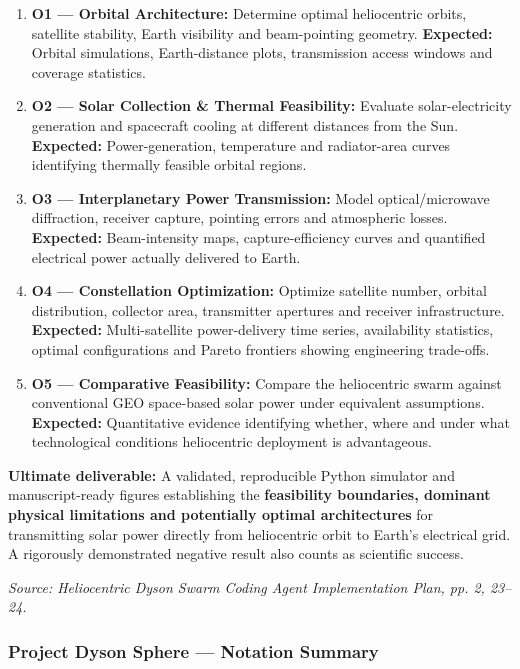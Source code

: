 \documentclass{article}
\begin{document}
\begin{enumerate}
\item \textbf{O1 --- Orbital Architecture:} Determine optimal heliocentric orbits, satellite stability, Earth visibility and beam-pointing geometry. \textbf{Expected:} Orbital simulations, Earth-distance plots, transmission access windows and coverage statistics.
\item \textbf{O2 --- Solar Collection \& Thermal Feasibility:} Evaluate solar-electricity generation and spacecraft cooling at different distances from the Sun. \textbf{Expected:} Power-generation, temperature and radiator-area curves identifying thermally feasible orbital regions.
\item \textbf{O3 --- Interplanetary Power Transmission:} Model optical/microwave diffraction, receiver capture, pointing errors and atmospheric losses. \textbf{Expected:} Beam-intensity maps, capture-efficiency curves and quantified electrical power actually delivered to Earth.
\item \textbf{O4 --- Constellation Optimization:} Optimize satellite number, orbital distribution, collector area, transmitter apertures and receiver infrastructure. \textbf{Expected:} Multi-satellite power-delivery time series, availability statistics, optimal configurations and Pareto frontiers showing engineering trade-offs.
\item \textbf{O5 --- Comparative Feasibility:} Compare the heliocentric swarm against conventional GEO space-based solar power under equivalent assumptions. \textbf{Expected:} Quantitative evidence identifying whether, where and under what technological conditions heliocentric deployment is advantageous.
\end{enumerate}

\textbf{Ultimate deliverable:} A validated, reproducible Python simulator and manuscript-ready figures establishing the \textbf{feasibility boundaries, dominant physical limitations and potentially optimal architectures} for transmitting solar power directly from heliocentric orbit to Earth's electrical grid. A rigorously demonstrated negative result also counts as scientific success.

\textit{Source: Heliocentric Dyson Swarm Coding Agent Implementation Plan, pp. 2, 23--24.}
\subsubsection*{Project Dyson Sphere --- Notation Summary}
\end{document}
